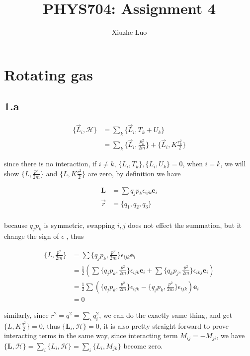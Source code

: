 \documentclass{article}
\title{PHYS704: Assignment 4}
\author{Xiuzhe Luo}
\date{}
\begin{document}
\maketitle

\section*{Rotating gas}
\subsection*{1.a}

$$
\begin{aligned}
    \{\vec{L}_i, \mathcal{H}\} &= \sum_k \{\vec{L}_i, T_k + U_k\} \\
    &= \sum_k \{\vec{L}_i, \frac{p^2_k}{2m}\} + \{\vec{L}_i, K\frac{r_k^2}{2}\}
\end{aligned}
$$

since there is no interaction, if $i \neq k$, $\{L_i, T_k\}, \{L_i, U_k\} = 0$, when $i = k$, we will show
$\{L, \frac{p^2}{2m}\}$ and $\{L, K\frac{r^2}{2}\}$ are zero, by definition we have

$$
\begin{aligned}
    \mathbf{L} &= \sum q_j p_k \epsilon_{ijk}\mathbf{e}_i\\
    \vec{r} &= \{q_{1}, q_{2}, q_{3}\}\\
\end{aligned}
$$

because $q_j p_k$ is symmetric, swapping $i, j$ does not effect the summation, but it change
the sign of $\epsilon$ , thus

$$
\begin{aligned}
    \{L, \frac{p^2}{2m}\} &= \sum \{q_j p_k, \frac{p^2}{2m}\} \epsilon_{ijk} \mathbf{e}_i\\
    &= \frac{1}{2}(\sum\{q_j p_k, \frac{p^2}{2m}\} \epsilon_{ijk} \mathbf{e}_i + \sum\{q_k p_j, \frac{p^2}{2m}\} \epsilon_{ikj} \mathbf{e}_i)\\
    &= \frac{1}{2}\sum(\{q_j p_k, \frac{p^2}{2m}\} \epsilon_{ijk} - \{q_j p_k, \frac{p^2}{2m}\} \epsilon_{ijk}) \mathbf{e}_i\\
    &= 0
\end{aligned}
$$

similarly, since $r^2 = q^2 = \sum_i q^2_i$, we can do the exactly same thing, and get $\{L, K\frac{q^2}{2}\} = 0$, thus $\{\mathbf{L}_i, \mathcal{H}\} = 0$,
it is also pretty straight forward to prove interacting terms in the same way, since interacting term $M_{ij} = -M_{ji}$, we have
$\{\mathbf{L}, \mathcal{H}\} = \sum_i \{L_i, \mathcal{H}\} = \sum_i \{L_i, M_{jk}\}$ become zero.
\end{document}
